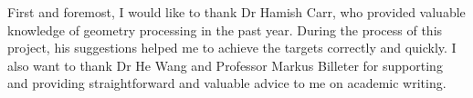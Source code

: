 First and foremost, I would like to thank Dr Hamish Carr, who provided valuable knowledge of geometry processing in the past year. During the process of this project, his suggestions helped me to achieve the targets correctly and quickly. I also want to thank Dr He Wang and Professor Markus Billeter for supporting and providing straightforward and valuable advice to me on academic writing.